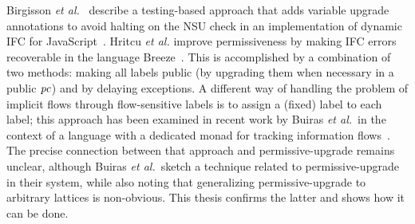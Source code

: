 Birgisson \emph{et al.}~\cite{esorics12} describe a testing-based
approach that adds variable upgrade annotations to avoid halting on
the NSU check in an implementation of dynamic IFC for
JavaScript~\cite{csf12}. Hritcu \emph{et al.}  improve permissiveness
by making IFC errors recoverable in the language
Breeze~\cite{Hritcu:ifc}. This is accomplished by a combination of two
methods: making all labels public (by upgrading them when necessary in
a public $\mathit{pc}$) and by delaying exceptions. A different way of handling the 
problem of implicit flows through flow-sensitive labels is to assign a
(fixed) label to each label; this approach has been examined in recent
work by Buiras \emph{et al.}\ in the context of a language with a
dedicated monad for tracking information flows~\cite{buiras14CSF}. The
precise connection between that approach and permissive-upgrade
remains unclear, although Buiras \emph{et al.}\ sketch a technique
related to permissive-upgrade in their system, while also noting that
generalizing permissive-upgrade to arbitrary lattices is
non-obvious. This thesis confirms the latter and shows how it can be
done.

